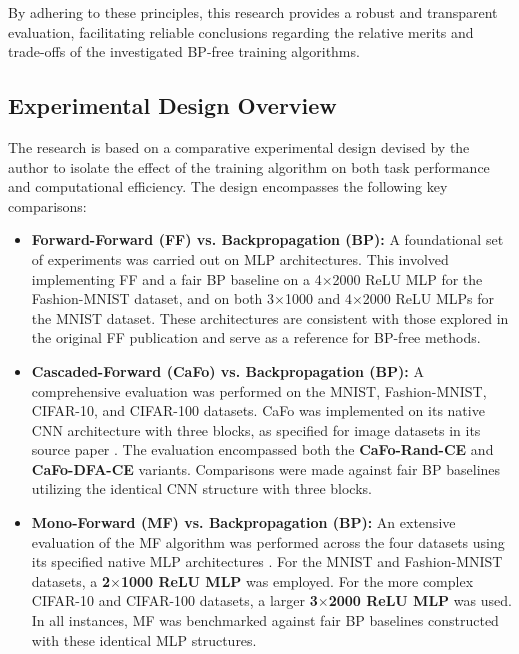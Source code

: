 By adhering to these principles, this research provides a robust and transparent evaluation, facilitating reliable conclusions regarding the relative merits and trade-offs of the investigated BP-free training algorithms.

\subsection{Experimental Design Overview}
\label{sec:methodology_design}
The research is based on a comparative experimental design devised by the author to isolate the effect of the training algorithm on both task performance and computational efficiency. The design encompasses the following key comparisons:
\begin{itemize}
    \item \textbf{Forward-Forward (FF) vs. Backpropagation (BP):} A foundational set of experiments was carried out on MLP architectures. This involved implementing FF and a fair BP baseline on a 4$\times$2000 ReLU MLP for the Fashion-MNIST dataset, and on both 3$\times$1000 and 4$\times$2000 ReLU MLPs for the MNIST dataset. These architectures are consistent with those explored in the original FF publication \cite{hinton2022forward} and serve as a reference for BP-free methods.
    \item \textbf{Cascaded-Forward (CaFo) vs. Backpropagation (BP):} A comprehensive evaluation was performed on the MNIST, Fashion-MNIST, CIFAR-10, and CIFAR-100 datasets. CaFo was implemented on its native CNN architecture with three blocks, as specified for image datasets in its source paper \cite{zhao2023cafo}. The evaluation encompassed both the \textbf{CaFo-Rand-CE} and \textbf{CaFo-DFA-CE} variants. Comparisons were made against fair BP baselines utilizing the identical CNN structure with three blocks.
    \item \textbf{Mono-Forward (MF) vs. Backpropagation (BP):} An extensive evaluation of the MF algorithm was performed across the four datasets using its specified native MLP architectures \cite{gong2025mono}. For the MNIST and Fashion-MNIST datasets, a \textbf{2$\times$1000 ReLU MLP} was employed. For the more complex CIFAR-10 and CIFAR-100 datasets, a larger \textbf{3$\times$2000 ReLU MLP} was used. In all instances, MF was benchmarked against fair BP baselines constructed with these identical MLP structures.
\end{itemize}
